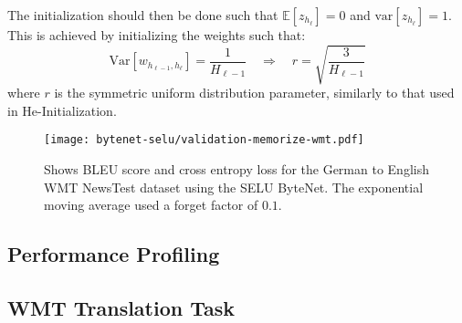 The initialization should then be done such that $\mathbb{E}[z_{h_\ell}] = 0$ and $\mathrm{var}[z_{h_\ell}] = 1$. This is achieved by initializing the weights such that:
\begin{equation}
\mathrm{Var}[w_{h_{\ell-1}, h_{\ell}}] = \frac{1}{H_{\ell-1}} \quad \Rightarrow \quad r = \sqrt{\frac{3}{H_{\ell-1}}}
\end{equation}
where $r$ is the symmetric uniform distribution parameter, similarly to that used in He-Initialization.

\begin{figure}[h]
    \centering
    \texttt{[image: bytenet-selu/validation-memorize-wmt.pdf]}
    \caption{Shows BLEU score and cross entropy loss for the German to English WMT NewsTest dataset using the SELU ByteNet. The exponential moving average used a forget factor of $0.1$.}
    \label{fig:result:selu-bytenet:bytenet-selu-wmt}
\end{figure}


\clearpage
\subsection{Performance Profiling}


\subsection{WMT Translation Task}

